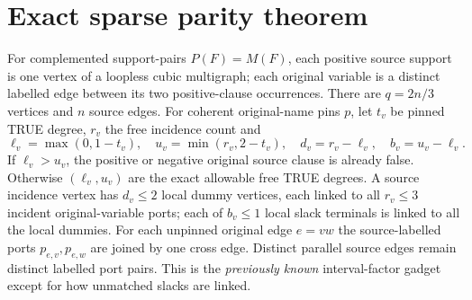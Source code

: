 \documentclass[11pt]{article}
\begin{document}
\section{Exact sparse parity theorem}
For complemented support-pairs $P(F)=M(F)$, each positive source support is one vertex of a loopless cubic multigraph; each original variable is a distinct labelled edge between its two positive-clause occurrences. There are $q=2n/3$ vertices and $n$ source edges. For coherent original-name pins $p$, let $t_v$ be pinned TRUE degree, $r_v$ the free incidence count and
\[
\ell_v=\max(0,1-t_v),\quad u_v=\min(r_v,2-t_v),
\quad d_v=r_v-\ell_v,\quad b_v=u_v-\ell_v.
\]
If $\ell_v>u_v$, the positive or negative original source clause is already false. Otherwise $(\ell_v,u_v)$ are the exact allowable free TRUE degrees. A source incidence vertex has $d_v\le2$ local dummy vertices, each linked to all $r_v\le3$ incident original-variable ports; each of $b_v\le1$ local slack terminals is linked to all the local dummies. For each unpinned original edge $e=vw$ the source-labelled ports $p_{e,v},p_{e,w}$ are joined by one cross edge. Distinct parallel source edges remain distinct labelled port pairs. This is the \emph{previously known} interval-factor gadget except for how unmatched slacks are linked.
\end{document}
